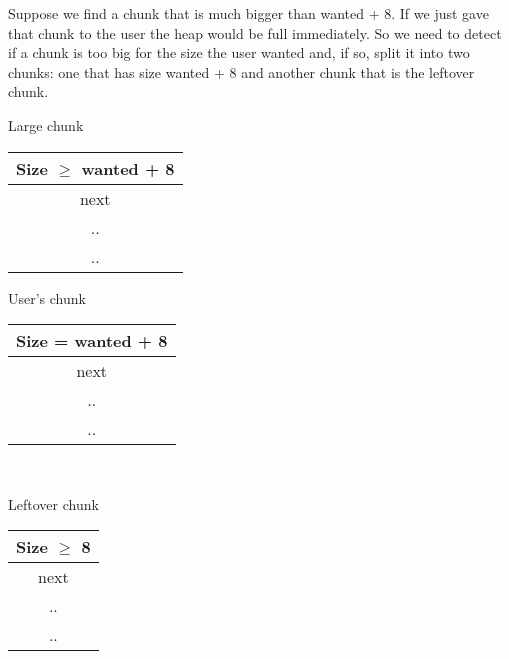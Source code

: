 \documentclass[12pt, letterpaper]{article}
\begin{document}
Suppose we find a chunk that is much bigger than wanted + 8. If we just gave that chunk to the user the heap would be full immediately. So we need to detect if a chunk is too big for the size the user wanted and, if so, split it into two chunks: one that has size wanted + 8 and another chunk that is the leftover chunk.\\

\begin{minipage}[t]{0.5\textwidth}
\begin{center}
Large chunk\\
\begin{tabular}{|c|}
\hline
Size \(\geq\) wanted + 8\\
\hline
next\\
\hline
..\\
..\\
\hline
\end{tabular}
\end{center}
\end{minipage}
\begin{minipage}[t]{0.5\textwidth}

\begin{center}
User's chunk\\

\begin{tabular}{|c|}
\hline
Size = wanted + 8\\
\hline
next\\
\hline
..\\
..\\
\hline
\end{tabular}\\

\vspace{7mm}

Leftover chunk\\

\begin{tabular}{|c|}
\hline
Size \(\geq\) 8\\
\hline
next\\
\hline
..\\
..\\
\hline
\end{tabular}
\end{center}
\end{minipage}

\vspace{7mm}
\end{document}
